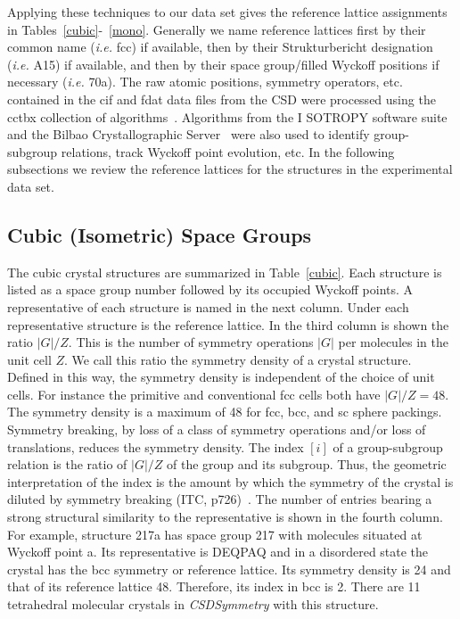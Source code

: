 \documentclass[preprint]{revtex4}              %
\begin{document}
Applying these techniques to our data set gives the reference
lattice assignments in Tables~\ref{cubic}-~\ref{mono}. Generally we
name reference lattices first by their common name (\emph{i.e.} fcc)
if available, then by their Strukturbericht designation (\emph{i.e.}
A15) if available, and then by their space group/filled Wyckoff
positions if necessary (\emph{i.e.} 70a).  The raw atomic positions,
symmetry operators, etc. contained in the cif and fdat data files
from the CSD were processed using the cctbx collection of
algorithms~\cite{Grosse-Kunstleve02}. Algorithms from the I{\small
SOTROPY} software suite~\cite{Stokes02b} and the Bilbao
Crystallographic Server~\cite{Kroumova03} were also used to identify
group-subgroup relations, track Wyckoff point evolution, etc. In the
following subsections we review the reference lattices for the
structures in the experimental data set.

\subsection{Cubic (Isometric) Space Groups}

The cubic crystal structures are summarized in Table~\ref{cubic}.
Each structure is listed as a space group number followed by its
occupied Wyckoff points. A representative of each structure is named
in the next column.  Under each representative structure is  the
reference lattice. In the third column is shown the ratio $|G|/Z$.
This is the number of symmetry operations $|G|$ per molecules in the
unit cell $Z$. We call this ratio the symmetry density of a crystal
structure. Defined in this way, the symmetry density is independent
of the choice of unit cells. For instance the primitive and
conventional fcc cells both have $|G|/Z=48$. The symmetry density is
a maximum of 48 for fcc, bcc, and sc sphere packings. Symmetry
breaking, by loss of a class of symmetry operations and/or loss of
translations, reduces the symmetry density. The index $[i]$ of a
group-subgroup relation is the ratio of $|G|/Z$ of the group and its
subgroup. Thus, the geometric interpretation of the index is the
amount by which the symmetry of the crystal is diluted by symmetry
breaking (ITC, p726)~\cite{Hahn83}. The number of entries bearing a
strong structural similarity to the representative is shown in the
fourth column. For example, structure 217a has space group 217 with
molecules situated at Wyckoff point a. Its representative is DEQPAQ
and in a disordered state the crystal has the bcc symmetry or
reference lattice. Its symmetry density is 24 and that of its
reference lattice 48. Therefore, its index in bcc is 2. There are 11
tetrahedral molecular crystals in \emph{CSDSymmetry} with this
structure.
\end{document}
